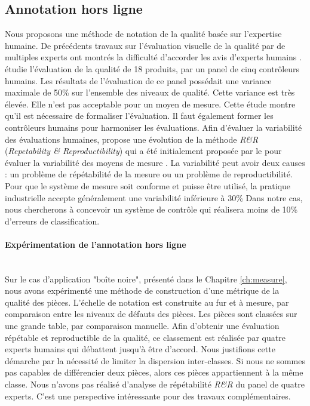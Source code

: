 \subsection{Annotation hors ligne}
Nous proposons une méthode de notation de la qualité basée sur l'expertise humaine.
De précédents travaux sur l'évaluation visuelle de la qualité par de multiples experts ont montrés la difficulté d'accorder les avis d'experts humains \cite{baudet_visual_2011}.
\citeauthor{baudet_visual_2011} étudie l'évaluation de la qualité de 18 produits, par un panel de cinq contrôleurs humains.
Les résultats de l'évaluation de ce panel possédait une variance maximale de 50\% sur l'ensemble des niveaux de qualité.
Cette variance est très élevée.
Elle n'est pas acceptable pour un moyen de mesure.
Cette étude montre qu'il est nécessaire de formaliser l'évaluation.
Il faut également former les contrôleurs humains pour harmoniser les évaluations.
Afin d'évaluer la variabilité des évaluations humaines,  \citeauthor{baudet_maitrise_2012} \cite{baudet_maitrise_2012} propose une évolution de la méthode \textit{R\&R} (\textit{Repetability \& Reproductibility}) qui a été initialement proposée par le \citeauthor{automotiveindustryactiongroup_measurement_2010} pour évaluer la variabilité des moyens de mesure \cite{automotiveindustryactiongroup_measurement_2010}.
La variabilité peut avoir deux causes : un problème de répétabilité de la mesure ou un problème de reproductibilité.
Pour que le système de mesure soit conforme et puisse être utilisé, la pratique industrielle accepte généralement une variabilité inférieure à 30\%
Dans notre cas, nous chercherons à concevoir un système de contrôle qui réalisera moins de 10\% d'erreurs de classification.

\paragraph{Expérimentation de l'annotation hors ligne}\mbox{} \label{parag:offline_annotation} \\
Sur le cas d'application "boîte noire", présenté dans le Chapitre \ref{ch:measure}, nous avons expérimenté une méthode de construction d'une métrique de la qualité des pièces.
L'échelle de notation est construite au fur et à mesure, par comparaison entre les niveaux de défauts des pièces.
Les pièces sont classées sur une grande table, par comparaison manuelle.
Afin d'obtenir une évaluation répétable et reproductible de la qualité, ce classement est réalisée par quatre experts humains qui débattent jusqu'à être d'accord.
Nous justifions cette démarche par la nécessité de limiter la dispersion inter-classes.
Si nous ne sommes pas capables de différencier deux pièces, alors ces pièces appartiennent à la même classe.
Nous n'avons pas réalisé d'analyse de répétabilité \textit{R\&R} du panel de quatre experts.
C'est une perspective intéressante pour des travaux complémentaires.

